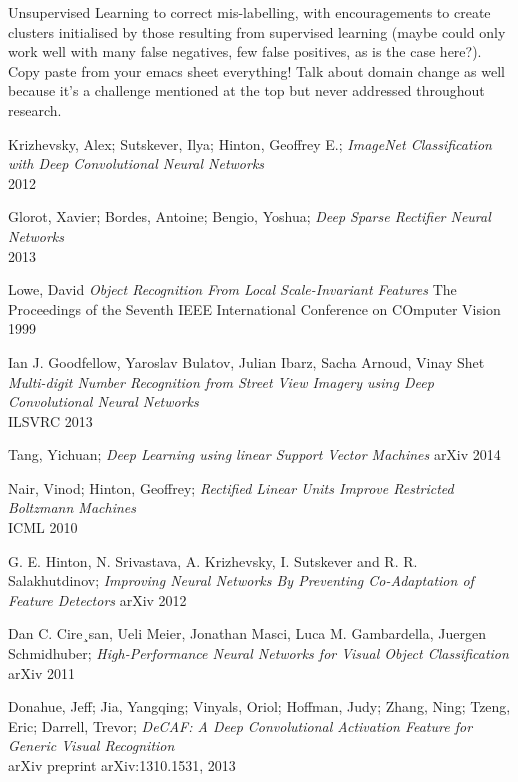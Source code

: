 \documentclass[a4paper,11pt]{article}
\begin{document}
Unsupervised Learning to correct mis-labelling, with encouragements to create clusters initialised by those resulting from supervised learning (maybe could only work well with many false negatives, few false positives, as is the case here?). \\ 

Copy paste from your emacs sheet everything! Talk about domain change as well because it's a challenge mentioned at the top but never addressed throughout research.



\begin{thebibliography}{1}

 Krizhevsky, Alex; Sutskever, Ilya; Hinton, Geoffrey E.;
 \emph{ImageNet Classification with Deep Convolutional Neural Networks}\\
 2012

 Glorot, Xavier; Bordes, Antoine; Bengio, Yoshua;
 \emph{Deep Sparse Rectifier Neural Networks}\\
 2013
 
 Lowe, David
 \emph{Object Recognition From Local Scale-Invariant Features}
 The Proceedings of the Seventh IEEE International Conference on COmputer Vision
 1999 
 
 Ian J. Goodfellow, Yaroslav Bulatov, Julian Ibarz, Sacha Arnoud, Vinay Shet
  \emph{Multi-digit Number Recognition from Street View Imagery using Deep Convolutional Neural Networks}\\
  ILSVRC 2013

 Tang, Yichuan;
 \emph{Deep Learning using linear Support Vector Machines}
 arXiv 2014

 Nair, Vinod; Hinton, Geoffrey;
  \emph{Rectified Linear Units Improve Restricted Boltzmann Machines}\\
  ICML 2010

 G. E. Hinton, N. Srivastava, A. Krizhevsky, I. Sutskever and R. R. Salakhutdinov;
 \emph{Improving Neural Networks By Preventing Co-Adaptation of Feature Detectors}
 arXiv 2012

 Dan C. Cire¸san, Ueli Meier, Jonathan Masci, Luca M. Gambardella, Juergen Schmidhuber;
 \emph{High-Performance Neural Networks for Visual Object Classification}
 arXiv 2011

 Donahue, Jeff; Jia, Yangqing; Vinyals, Oriol; Hoffman, Judy; Zhang, Ning; Tzeng, Eric; Darrell, Trevor;
  \emph{DeCAF: A Deep Convolutional Activation Feature for Generic Visual Recognition}\\
  arXiv preprint arXiv:1310.1531, 2013
  

\end{thebibliography}
\end{document}
